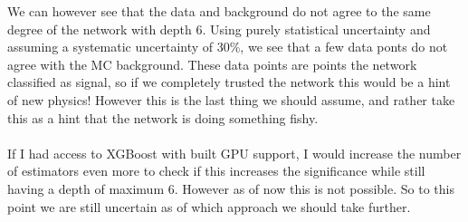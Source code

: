 \documentclass[14pt, a4paper]{book}
\begin{document}
We can however see that the data and background do not agree to the same degree of the network with depth 6. Using purely statistical uncertainty and assuming a systematic uncertainty of 30\%, we see that a few data ponts do not agree with the MC background.
These data points are points the network classified as signal, so if we completely trusted the network this would be a hint of new physics! 
However this is the last thing we should assume, and rather take this as a hint that the network is doing something fishy.\\
\\If I had access to XGBoost with built GPU support, I would increase the number of estimators even more to check if this increases the significance while still having a depth of maximum 6.
However as of now this is not possible. So to this point we are still uncertain as of which approach we should take further.


\clearpage
\graphicspath{{../../figures/}}
\end{document}
